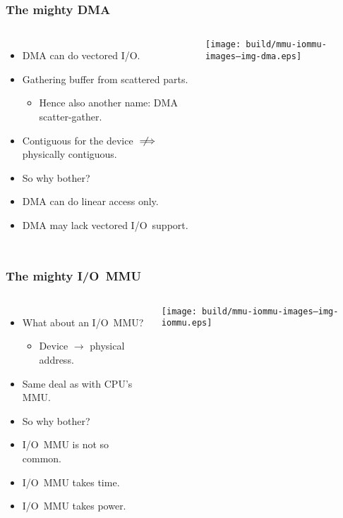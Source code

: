\begin{frame}
  \frametitle{The mighty DMA}

  \begin{columns}[c]

    \begin{itemize}
    \item DMA can do vectored I/O.
    \item Gathering buffer from scattered parts.
      \begin{itemize}
        \item {\footnotesize Hence also another name: DMA scatter-gather.}
      \end{itemize}
    \item Contiguous for the device $\notimplies$ physically contiguous.
    \item<1> So why bother?
    \item<2> DMA can do linear access only.
    \item<2> DMA may lack vectored I/O~support.
    \end{itemize}

    \begin{center}
      \texttt{[image: build/mmu-iommu-images--img-dma.eps]}
    \end{center}

  \end{columns}
\end{frame}

\begin{frame}
  \frametitle{The mighty I/O~MMU}

  \begin{columns}[c]

    \begin{itemize}
    \item What about an I/O~MMU?
      \begin{itemize}
      \item Device $\rightarrow$ physical address.
      \end{itemize}
    \item Same deal as with CPU's MMU.
    \item<1> So why bother?
    \item<2> I/O~MMU is not so common.
    \item<2> I/O~MMU takes time.
    \item<2> I/O~MMU takes power.
    \end{itemize}

    \begin{center}
      \texttt{[image: build/mmu-iommu-images--img-iommu.eps]}
    \end{center}

  \end{columns}
\end{frame}
